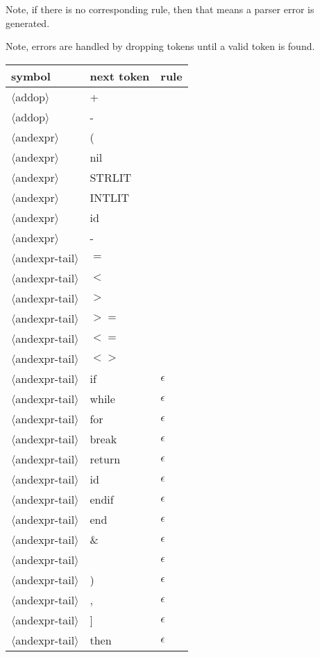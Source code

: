 \documentclass[11pt, fleqn]{article}
\newcommand{\atag}[1]{$\langle$#1$\rangle$}
\begin{document}
Note, if there is no corresponding rule, then that means a parser error is generated.

Note, errors are handled by dropping tokens until a valid token is found.

\begin{longtable}{l|l|l}
symbol							&	next token	&	rule									\\
\hline
\atag{addop}						&	+			&										\\
\atag{addop}						&	-			&										\\
\atag{andexpr} 					&	(			&		\\
\atag{andexpr} 					&	nil			&		\\
\atag{andexpr} 					&	STRLIT		&		\\
\atag{andexpr} 					&	INTLIT		&		\\
\atag{andexpr} 					&	id			&		\\
\atag{andexpr} 					&	-			&		\\
\atag{andexpr-tail}				&	$=$			&		\\
\atag{andexpr-tail}				&	$<$			&		\\
\atag{andexpr-tail}				&	$>$			&		\\
\atag{andexpr-tail}				&	$>=$			&		\\
\atag{andexpr-tail}				&	$<=$			&		\\
\atag{andexpr-tail}				&	$<>$			&		\\
\atag{andexpr-tail}				&	if			&	$\epsilon$	\\
\atag{andexpr-tail}				&	while		&	$\epsilon$	\\
\atag{andexpr-tail}				&	for			&	$\epsilon$	\\
\atag{andexpr-tail}				&	break		&	$\epsilon$	\\
\atag{andexpr-tail}				&	return		&	$\epsilon$	\\
\atag{andexpr-tail}				&	id			&	$\epsilon$	\\
\atag{andexpr-tail}				&	endif		&	$\epsilon$	\\
\atag{andexpr-tail}				&	end			&	$\epsilon$	\\
\atag{andexpr-tail}				&	\&			&	$\epsilon$	\\
\atag{andexpr-tail}				&	\textbar		&	$\epsilon$	\\
\atag{andexpr-tail}				&	)			&	$\epsilon$	\\
\atag{andexpr-tail}				&	,			&	$\epsilon$	\\
\atag{andexpr-tail}				&	]			&	$\epsilon$	\\
\atag{andexpr-tail}				&	then			&	$\epsilon$	\\

\end{longtable}
\end{document}
